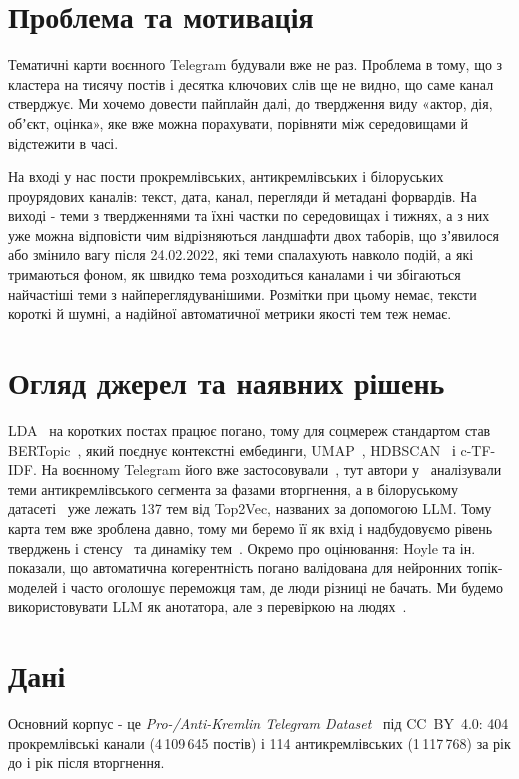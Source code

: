 \documentclass[ukrainian]{ucuproposal}
\begin{document}
\maketitlepage

\section{Проблема та мотивація}
Тематичні карти воєнного Telegram будували вже не раз. Проблема в тому,
що з кластера на тисячу постів і десятка ключових слів ще не видно, що саме канал стверджує. Ми хочемо
довести пайплайн далі, до твердження виду «актор, дія, обʼєкт, оцінка»,
яке вже можна порахувати, порівняти між середовищами й відстежити в часі.

На вході у нас пости прокремлівських, антикремлівських і білоруських
проурядових каналів: текст, дата, канал, перегляди й метадані форвардів.
На виході - теми з твердженнями та їхні частки по середовищах і тижнях, а
з них уже можна відповісти чим відрізняються ландшафти двох таборів, що
зʼявилося або змінило вагу після 24.02.2022, які теми спалахують навколо
подій, а які тримаються фоном, як швидко тема розходиться каналами і чи
збігаються найчастіші теми з найпереглядуванішими. Розмітки при цьому
немає, тексти короткі й шумні, а надійної автоматичної метрики якості тем
теж немає.

\section{Огляд джерел та наявних рішень}
LDA~\cite{blei2003lda} на коротких постах працює погано, тому для
соцмереж стандартом став BERTopic~\cite{grootendorst2022bertopic}, який
поєднує контекстні ембединги, UMAP~\cite{mcinnes2018umap},
HDBSCAN~\cite{campello2013hdbscan} і c-TF-IDF. На воєнному Telegram його
вже застосовували~\cite{tretiakov2024telegram}, тут автори у~\cite{bawa2025battlefield,bawa2024dissent} аналізували теми
антикремлівського сегмента за фазами вторгнення, а в білоруському
датасеті~\cite{rudnik2026autocrats} уже лежать 137 тем від Top2Vec,
названих за допомогою LLM. Тому карта тем вже зроблена давно, тому
ми беремо її як вхід і надбудовуємо рівень тверджень і
стенсу~\cite{hardalov2022stance} та динаміку тем~\cite{kleinberg2002bursts}.
Окремо про оцінювання: Hoyle та ін.~\cite{hoyle2021coherence} показали,
що автоматична когерентність погано валідована для нейронних
топік-моделей і часто оголошує переможця там, де люди різниці не бачать.
Ми будемо використовувати LLM як анотатора, але з перевіркою на
людях~\cite{gilardi2023chatgpt}.

\section{Дані}
Основний корпус - це \textit{Pro-/Anti-Kremlin Telegram
Dataset}~\cite{bawa2025data} під CC~BY~4.0: 404 прокремлівські канали
(4\,109\,645 постів) і 114 антикремлівських (1\,117\,768) за рік до і рік
після вторгнення.
\end{document}
